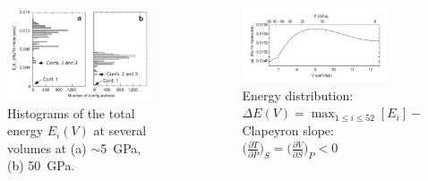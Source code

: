 \documentclass[13pt,aspectratio=169]{beamer}
\begin{document}
\begin{frame}{\subsecname}
	\begin{columns}
		\begin{column}{0.45\textwidth}
			\begin{figure}
				\includegraphics[width=\columnwidth]{images/deltae}%
				\caption{Histograms of the total energy $E_i(V)$ at several volumes at
					(a) $\sim$\SI{5}{\giga\pascal},
					(b) \SI{50}{\giga\pascal}.}
			\end{figure}
		\end{column}

		\begin{column}{0.45\textwidth}
			\begin{figure}
				\includegraphics[width=\columnwidth]{images/dltevsp}%
				\caption{Energy distribution: $\Delta E(V) = \max_{1 \leq i \leq 52}[E_i] - \min_{1 \leq i \leq 52}[E_i]$\\
					Clapeyron slope: $\Big( \frac{ \partial T }{ \partial P } \Big)_{ S } = \Big( \frac{ \partial V }{ \partial S } \Big)_{ P } < 0$}
			\end{figure}
		\end{column}
	\end{columns}
\end{frame}
\end{document}
